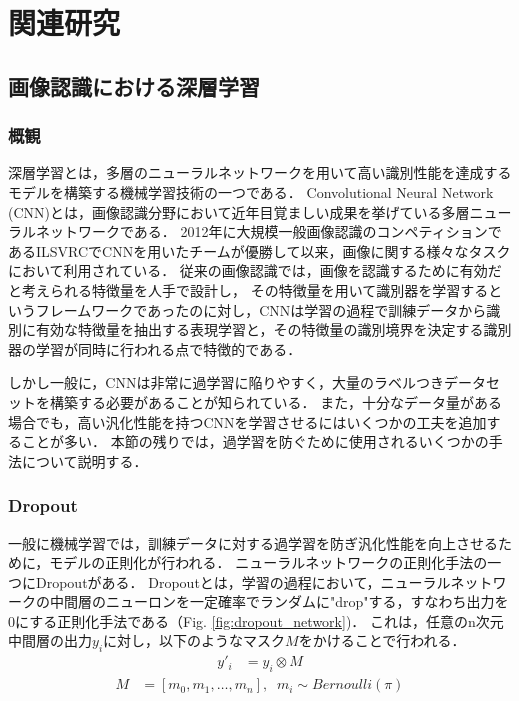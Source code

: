 \chapter{関連研究}

\section{画像認識における深層学習}
\subsection{概観}
深層学習とは，多層のニューラルネットワークを用いて高い識別性能を達成するモデルを構築する機械学習技術の一つである．
Convolutional Neural Network (CNN)とは，画像認識分野において近年目覚ましい成果を挙げている多層ニューラルネットワークである．
2012年に大規模一般画像認識のコンペティションであるILSVRC\cite{ILSVRC15}でCNNを用いたチームが優勝して以来，画像に関する様々なタスクにおいて利用されている．
従来の画像認識では，画像を認識するために有効だと考えられる特徴量を人手で設計し，
その特徴量を用いて識別器を学習するというフレームワークであったのに対し，CNNは学習の過程で訓練データから識別に有効な特徴量を抽出する表現学習と，その特徴量の識別境界を決定する識別器の学習が同時に行われる点で特徴的である．

しかし一般に，CNNは非常に過学習に陥りやすく，大量のラベルつきデータセットを構築する必要があることが知られている．
また，十分なデータ量がある場合でも，高い汎化性能を持つCNNを学習させるにはいくつかの工夫を追加することが多い．
本節の残りでは，過学習を防ぐために使用されるいくつかの手法について説明する．

\subsection{Dropout}
一般に機械学習では，訓練データに対する過学習を防ぎ汎化性能を向上させるために，モデルの正則化が行われる．
ニューラルネットワークの正則化手法の一つにDropout\cite{hinton2012improving, srivastava2014dropout}がある．
Dropoutとは，学習の過程において，ニューラルネットワークの中間層のニューロンを一定確率でランダムに"drop"する，すなわち出力を0にする正則化手法である（Fig. \ref{fig:dropout_network})．
これは，任意のn次元中間層の出力$y_i$に対し，以下のようなマスク$M$をかけることで行われる．
\begin{eqnarray*}
    y'_i &= y_i \otimes M 
\end{eqnarray*}
\begin{eqnarray*}
    M &= [m_0, m_1, \dots, m_n],\;\; m_i \sim Bernoulli(\pi) 
\end{eqnarray*}


